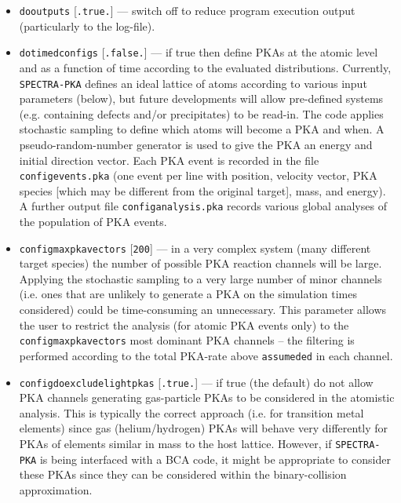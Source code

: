 \documentclass[a4paper]{article}
\begin{document}
\begin{itemize}
\item \texttt{do{\textunderscore}outputs} [\texttt{.true.}] --- switch off to reduce program execution output (particularly to the log-file).

\item \texttt{do{\textunderscore}timed{\textunderscore}configs} [\texttt{.false.}] --- if true then define PKAs at the atomic level and as a function of time according to the evaluated distributions. Currently, \texttt{SPECTRA-PKA} defines an ideal lattice of atoms according to various input parameters (below), but future developments will allow pre-defined systems (e.g. containing defects and/or precipitates) to be read-in. The code applies stochastic sampling to define which atoms will become a PKA and when. A pseudo-random-number generator is used to give the PKA an energy and initial direction vector. Each PKA event is recorded in the file \texttt{config{\textunderscore}events.pka} (one event per line with position, velocity vector, PKA species [which may be different from the original target], mass, and energy). A further output file \texttt{config{\textunderscore}analysis.pka} records various global analyses of the population of PKA events.

\item \texttt{config{\textunderscore}max{\textunderscore}pka{\textunderscore}vectors} [\texttt{200}] --- in a very complex system (many different target species) the number of possible PKA reaction channels will be large. Applying the stochastic sampling to a very large number of minor channels (i.e. ones that are unlikely to generate a PKA on the simulation times considered) could be time-consuming an unnecessary. This parameter allows the user to restrict the analysis (for atomic PKA events only) to the  \texttt{config{\textunderscore}max{\textunderscore}pka{\textunderscore}vectors} most dominant PKA channels -- the filtering is performed according to the total PKA-rate above \texttt{assumed{\textunderscore}ed}  in each channel.

\item \texttt{config{\textunderscore}do{\textunderscore}exclude{\textunderscore}light{\textunderscore}pkas} [\texttt{.true.}] --- if true (the default) do not allow PKA channels generating gas-particle PKAs to be considered in the atomistic analysis. This is typically the correct approach (i.e. for transition metal elements) since gas (helium/hydrogen) PKAs will behave very differently for PKAs of elements similar in mass to the host lattice. However, if \texttt{SPECTRA-PKA}  is being interfaced with a BCA code, it might be appropriate to consider these PKAs since they can be considered within the binary-collision approximation.


\end{itemize}
\end{document}
